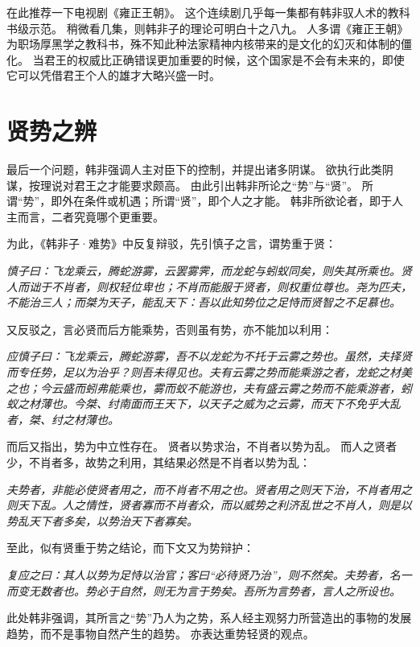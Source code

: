 \documentclass[11pt]{article}
\begin{document}
在此推荐一下电视剧《雍正王朝》。
这个连续剧几乎每一集都有韩非驭人术的教科书级示范。
稍微看几集，则韩非子的理论可明白十之八九。
人多谓《雍正王朝》为职场厚黑学之教科书，殊不知此种法家精神内核带来的是文化的幻灭和体制的僵化。
当君王的权威比正确错误更加重要的时候，这个国家是不会有未来的，即使它可以凭借君王个人的雄才大略兴盛一时。

\newline
  
\section{贤势之辨}
最后一个问题，韩非强调人主对臣下的控制，并提出诸多阴谋。
欲执行此类阴谋，按理说对君王之才能要求颇高。
由此引出韩非所论之“势”与“贤”。
所谓“势”，即外在条件或机遇；所谓“贤”，即个人之才能。
韩非所欲论者，即于人主而言，二者究竟哪个更重要。

\newline
  
为此，《韩非子·难势》中反复辩驳，先引慎子之言，谓势重于贤：

\textit{慎子曰：飞龙乘云，腾蛇游雾，云罢雾霁，而龙蛇与蚓蚁同矣，则失其所乘也。贤人而诎于不肖者，则权轻位卑也；不肖而能服于贤者，则权重位尊也。尧为匹夫，不能治三人；而桀为天子，能乱天下：吾以此知势位之足恃而贤智之不足慕也。}

又反驳之，言必贤而后方能乘势，否则虽有势，亦不能加以利用：

\textit{应慎子曰：飞龙乘云，腾蛇游雾，吾不以龙蛇为不托于云雾之势也。虽然，夫择贤而专任势，足以为治乎？则吾未得见也。夫有云雾之势而能乘游之者，龙蛇之材美之也；今云盛而蚓弗能乘也，雾而蚁不能游也，夫有盛云雾之势而不能乘游者，蚓蚁之材薄也。今桀、纣南面而王天下，以天子之威为之云雾，而天下不免乎大乱者，桀、纣之材薄也。}

而后又指出，势为中立性存在。
贤者以势求治，不肖者以势为乱。
而人之贤者少，不肖者多，故势之利用，其结果必然是不肖者以势为乱：

\textit{夫势者，非能必使贤者用之，而不肖者不用之也。贤者用之则天下治，不肖者用之则天下乱。人之情性，贤者寡而不肖者众，而以威势之利济乱世之不肖人，则是以势乱天下者多矣，以势治天下者寡矣。}

至此，似有贤重于势之结论，而下文又为势辩护：

\textit{复应之曰：其人以势为足恃以治官；客曰“必待贤乃治”，则不然矣。夫势者，名一而变无数者也。势必于自然，则无为言于势矣。吾所为言势者，言人之所设也。}

此处韩非强调，其所言之“势”乃人为之势，系人经主观努力所营造出的事物的发展趋势，而不是事物自然产生的趋势。
亦表达重势轻贤的观点。
\end{document}
